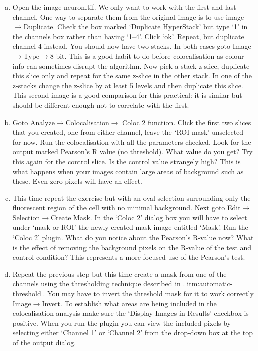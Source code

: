 \documentclass[a4paper,oneside,article]{memoir}
\begin{document}
    \begin{enumerate}[(a)]
      \item Open the image neuron.tif. We only want to work with the
      first and last channel. One way to separate them from the
      original image is to use image$\rightarrow$Duplicate. Check the
      box marked `Duplicate HyperStack' but type `1' in the channels
      box rather than having `1--4'. Click `ok'. Repeat, but duplicate
      channel 4 instead. You should now have two stacks. In both cases
      goto Image$\rightarrow$Type$\rightarrow$8-bit. This is a good
      habit to do before colocalisation as colour info can sometimes
      disrupt the algorithm. Now pick a stack z-slice, duplicate this
      slice only and repeat for the same z-slice in the other stack.
      In one of the z-stacks change the z-slice by at least 5 levels
      and then duplicate this slice. This second image is a good
      comparison for this practical: it is similar but should be
      different enough not to correlate with the first.

      \item Goto Analyze$\rightarrow$Colocalisation$\rightarrow$ Coloc 2
      function. Click the first two slices that you created, one from
      either channel, leave the `ROI mask' unselected for now. Run the
      colocalisation with all the parameters checked. Look for the
      output marked Pearson's R value (no threshold). What value do
      you get? Try this again for the control slice. Is the control
      value strangely high? This is what happens when your images
      contain large areas of background such as these. Even zero pixels
      will have an effect.

      \item This time repeat the exercise but with an oval selection
      surrounding only the fluorescent region of the cell with no
      minimal background. Next goto
      Edit$\rightarrow$Selection$\rightarrow$Create Mask.  In the
      `Coloc 2' dialog box you will have to select under `mask or ROI'
      the newly created mask image entitled `Mask'. Run the `Coloc 2'
      plugin. What do you notice about the Pearson's R-value now? What
      is the effect of removing the background pixels on the R-value
      of the test and control condition? This represents a more focused
      use of the Pearson’s test.

      \item Repeat the previous step but this time create a mask from
      one of the channels using the thresholding technique described in
      .\ref{itm:automatic-threshold}. You may have
      to invert the threshold mask for it to work correctly
      Image$\rightarrow$Invert. To establish what areas are being
      included in the colocalisation analysis make sure the `Display
      Images in Results' checkbox is positive. When you run the plugin
      you can view the included pixels by selecting either `Channel 1'
      or `Channel 2' from the drop-down box at the top of the output dialog.


\end{enumerate}
\end{document}
